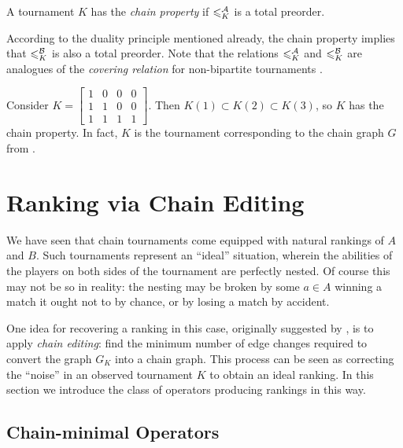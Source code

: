 \begin{definition}%
    A tournament $K$ has the \emph{chain property} if $\leqslant^{\mathcal{A}}_K$ is a total
    preorder.
\end{definition}

According to the duality principle mentioned already, the chain property
implies that $\leqslant^{\mathcal{B}}_K$ is also a total preorder. Note that the relations
$\leqslant^{\mathcal{A}}_K$ and $\leqslant^{\mathcal{B}}_K$ are analogues of the \emph{covering relation} for
non-bipartite tournaments \cite{brandt2016a}.

\begin{example}
    Consider
    $
        K = \left[\begin{smallmatrix}
            1 & 0 & 0 & 0 \\
            1 & 1 & 0 & 0 \\
            1 & 1 & 1 & 1
        \end{smallmatrix}\right]
    $. Then $K(1) \subset K(2) \subset K(3)$, so $K$ has the chain
    property.  In fact, $K$ is the tournament corresponding to the chain graph
    $G$ from .

\end{example}

\section{Ranking via Chain Editing}
\label{tourn_sec_ranking_via_chain_editing}

We have seen that chain tournaments
come equipped with natural rankings of $A$ and $B$. Such tournaments represent
an ``ideal'' situation, wherein the abilities of the players on both sides of the
tournament are perfectly nested. Of course this may not be so in reality:
the nesting may be broken by some $a \in A$ winning a match it ought not to by
chance, or by losing a match by accident.

One idea for recovering a ranking in this case, originally suggested
by \textcite{jiao2017algorithms}, is to apply \emph{chain editing}: find the
minimum number of edge changes required to convert the graph $G_K$ into a chain
graph. This process can be seen as correcting the ``noise'' in an observed
tournament $K$ to obtain an ideal ranking. In this section we introduce the
class of operators producing rankings in this way.

\subsection{Chain-minimal Operators}

